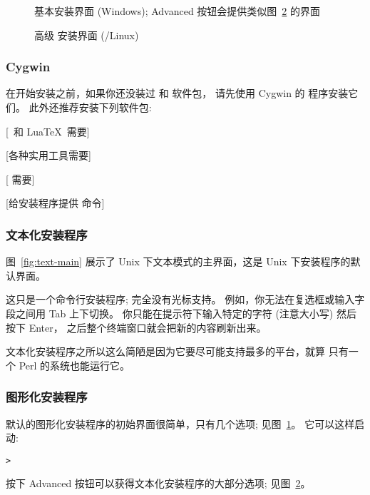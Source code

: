 \documentclass{article}
\begin{document}
\begin{figure}[tb]
\caption{基本安装界面 (Windows); 
  Advanced 按钮会提供类似图~\ref{fig:advanced-lnx} 的界面}\label{fig:basic-w32}
\end{figure}

\begin{figure}[tb]
\caption{高级 \GUI{} 安装界面
  (\GNU/Linux)}\label{fig:advanced-lnx}
\end{figure}
  

\subsubsection{Cygwin}
\label{sec:cygwin}

在开始安装之前，如果你还没装过 和  软件包，
请先使用 Cygwin 的  程序安装它们。
此外还推荐安装下列软件包: 
\begin{itemize*}
\item {} [\XeTeX\ 和 Lua\TeX\ 需要]
\item {} [各种实用工具需要]
\item {} [ 需要]
\item {} [给安装程序提供  命令]
\end{itemize*}

\subsubsection{文本化安装程序}

图~\ref{fig:text-main} 展示了 Unix 下文本模式的主界面，这是 Unix
下安装程序的默认界面。

这只是一个命令行安装程序; 完全没有光标支持。
例如，你无法在复选框或输入字段之间用 Tab 上下切换。
你只能在提示符下输入特定的字符
(注意大小写) 然后按下 Enter，
之后整个终端窗口就会把新的内容刷新出来。

文本化安装程序之所以这么简陋是因为它要尽可能支持最多的平台，就算
只有一个 Perl 的系统也能运行它。

\subsubsection{图形化安装程序}
\label{sec:graphical-inst}

默认的图形化安装程序的初始界面很简单，只有几个选项; 见图~\ref{fig:basic-w32}。
它可以这样启动: 
\begin{alltt}
> 
\end{alltt}
按下 Advanced 按钮可以获得文本化安装程序的大部分选项; 见图~\ref{fig:advanced-lnx}。
\end{document}
